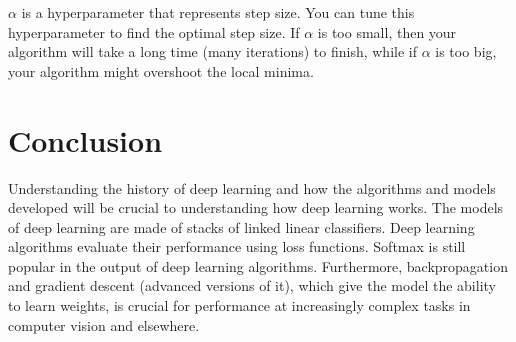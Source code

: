 \documentclass{article}
\begin{document}
$\alpha$ is a hyperparameter that represents step size. You can tune this hyperparameter to find the optimal step size. If $\alpha$ is too small, then your algorithm will take a long time (many iterations) to finish, while if $\alpha$ is too big, your algorithm might overshoot the local minima.

 
\section{Conclusion}
Understanding the history of deep learning and how the algorithms and models developed will be crucial to understanding how deep learning works. The models of deep learning are made of stacks of linked linear classifiers. Deep learning algorithms evaluate their performance using loss functions. Softmax is still popular in the output of deep learning algorithms. Furthermore, backpropagation and gradient descent (advanced versions of it), which give the model the ability to learn weights, is crucial for performance at increasingly complex tasks in computer vision and elsewhere.



\small



\bigskip
\end{document}

